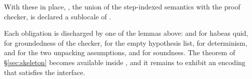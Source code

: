With these in place, , the union of the step-indexed semantics
with the proof checker, is declared a sublocale of .


\noindent
Each obligation is discharged by one of the lemmas above:
 and  for habeas quid,
 for groundedness of the checker,
 for the empty hypothesis list,
 for determinism,
 and  for the two unpacking
assumptions, and  for soundness.  The theorem
 of \S\ref{sec:skeleton} becomes available
inside , and it remains to exhibit an encoding that satisfies
the interface.
